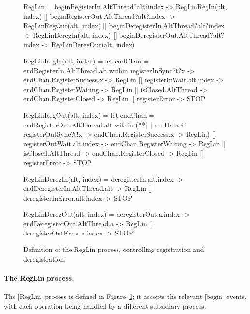 
\begin{figure}
\begin{cspm}
RegLin = 
  beginRegisterIn.AltThread?alt?index -> RegLinRegIn(alt, index)
  [] beginRegisterOut.AltThread?alt?index -> RegLinRegOut(alt, index)
  [] beginDeregisterIn.AltThread?alt?index -> RegLinDeregIn(alt, index)
  [] beginDeregisterOut.AltThread?alt?index -> RegLinDeregOut(alt, index)
  
RegLinRegIn(alt, index) = 
  let endChan = endRegisterIn.AltThread.alt within
  registerInSync?t?x -> endChan.RegisterSuccess.x -> RegLin
  [] registerInWait.alt.index -> endChan.RegisterWaiting -> RegLin
  [] isClosed.AltThread -> endChan.RegisterClosed -> RegLin
  [] registerError -> STOP

RegLinRegOut(alt, index) = 
  let endChan = endRegisterOut.AltThread.alt within
  (**|~| x : Data @ registerOutSync?t!x -> endChan.RegisterSuccess.x -> RegLin)
  [] registerOutWait.alt.index -> endChan.RegisterWaiting -> RegLin
  [] isClosed.AltThread -> endChan.RegisterClosed -> RegLin
  [] registerError -> STOP
  
RegLinDeregIn(alt, index) = 
  deregisterIn.alt.index -> endDeregisterIn.AltThread.alt -> RegLin
  [] deregisterInError.alt.index -> STOP
    
RegLinDeregOut(alt, index) = 
  deregisterOut.a.index -> endDeregisterOut.AltThread.a -> RegLin
  [] deregisterOutError.a.index -> STOP
\end{cspm}
\caption{Definition of the {\cspmstyle RegLin} process, controlling
  registration and deregistration.  \label{fig:RegLin}}
\end{figure}


\paragraph{The {\cspmstyle RegLin} process.}

The |RegLin| process is defined in Figure~\ref{fig:RegLin}; it accepts the
relevant |begin| events, with each operation being handled by a different
subsidiary process. 

